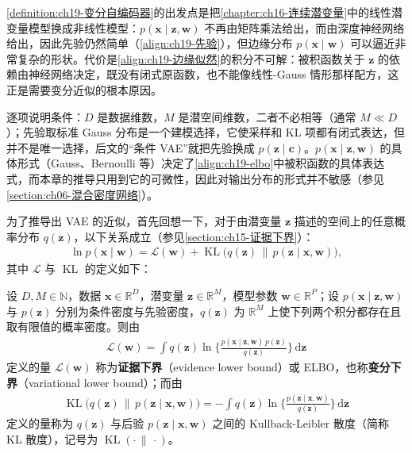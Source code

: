 \documentclass[../../main.tex]{subfiles}
\begin{document}
\begin{remark}
\cref{definition:ch19-变分自编码器}的出发点是把\cref{chapter:ch16-连续潜变量}中的线性潜变量模型换成非线性模型：$p(\bm{x}\mid\bm{z},\bm{w})$ 不再由矩阵乘法给出，而由深度神经网络给出，因此先验仍然简单（\eqref{align:ch19-先验}），但边缘分布 $p(\bm{x}\mid\bm{w})$ 可以逼近非常复杂的形状。代价是\eqref{align:ch19-边缘似然}的积分不可解：被积函数关于 $\bm{z}$ 的依赖由神经网络决定，既没有闭式原函数，也不能像线性-Gauss 情形那样配方，这正是需要变分近似的根本原因。

逐项说明条件：$D$ 是数据维数，$M$ 是潜空间维数，二者不必相等（通常 $M\ll D$）；先验取标准 Gauss 分布是一个建模选择，它使采样和 KL 项都有闭式表达，但并不是唯一选择，后文的“条件 VAE”就把先验换成 $p(\bm{z}\mid\bm{c})$。$p(\bm{x}\mid\bm{z},\bm{w})$ 的具体形式（Gauss、Bernoulli 等）决定了\eqref{align:ch19-elbo}中被积函数的具体表达式，而本章的推导只用到它的可微性，因此对输出分布的形式并不敏感（参见\cref{section:ch06-混合密度网络}）。
\end{remark}

为了推导出 VAE 的近似，首先回想一下，对于由潜变量 $\bm{z}$ 描述的空间上的任意概率分布 $q(\bm{z})$，以下关系成立（参见\cref{section:ch15-证据下界}）：
\begin{align}
\ln p(\bm{x}\mid\bm{w})=\mathcal{L}(\bm{w})+\operatorname{KL}\big(q(\bm{z})\,\|\,p(\bm{z}\mid\bm{x},\bm{w})\big),
\label{align:ch19-elbo分解}
\end{align}
其中 $\mathcal{L}$ 与 $\operatorname{KL}$ 的定义如下：

\begin{definition}[证据下界与 KL 散度]\label{definition:ch19-证据下界}
设 $D,M\in\mathbb{N}$，数据 $\bm{x}\in\mathbb{R}^{D}$，潜变量 $\bm{z}\in\mathbb{R}^{M}$，模型参数 $\bm{w}\in\mathbb{R}^{P}$；设 $p(\bm{x}\mid\bm{z},\bm{w})$ 与 $p(\bm{z})$ 分别为条件密度与先验密度，$q(\bm{z})$ 为 $\mathbb{R}^{M}$ 上使下列两个积分都存在且取有限值的概率密度。则由
\begin{align}
\mathcal{L}(\bm{w})=\int q(\bm{z})\ln\Big\{\frac{p(\bm{x}\mid\bm{z},\bm{w})\,p(\bm{z})}{q(\bm{z})}\Big\}\,\mathrm{d}\bm{z}
\label{align:ch19-elbo}
\end{align}
定义的量 $\mathcal{L}(\bm{w})$ 称为\textbf{证据下界}（evidence lower bound）或 ELBO，也称\textbf{变分下界}（variational lower bound）；而由
\begin{align}
\operatorname{KL}\big(q(\bm{z})\,\|\,p(\bm{z}\mid\bm{x},\bm{w})\big)=-\int q(\bm{z})\ln\Big\{\frac{p(\bm{z}\mid\bm{x},\bm{w})}{q(\bm{z})}\Big\}\,\mathrm{d}\bm{z}
\label{align:ch19-kl}
\end{align}
定义的量称为 $q(\bm{z})$ 与后验 $p(\bm{z}\mid\bm{x},\bm{w})$ 之间的 Kullback-Leibler 散度（简称 KL 散度），记号为 $\operatorname{KL}(\cdot\,\|\,\cdot)$。
\end{definition}
\end{document}
